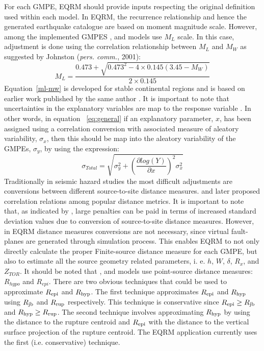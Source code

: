 For each GMPE, EQRM should provide inputs respecting the original
definition used within each model. In EQRM, the recurrence
relationship and hence the generated earthquake catalogue are based
on moment magnitude scale. However, among the implemented GMPES
\citet{eqrm_Gaull90a}, and \citet{eqrm_Liang08} models use $M_L$
scale. In this case, adjustment is done using the correlation
relationship between $M_L$ and $M_W$ as suggested by Johnston
(\textit{pers. comm.}, 2001):
\begin{equation}\label{ml-mw}
M_L =
\frac{0.473+\sqrt{0.473^2-4\times0.145(3.45-M_W)}}{2\times0.145}
\end{equation}
Equation~\ref{ml-mw} is developed for stable continental regions and
is based on earlier work published by the same author
\citep{eqrm_Johnstone96a}. It is important to note that
uncertainties in the explanatory variables are map to the response
variable \citep{eqrm_Bommer05}. In other words, in equation
~\ref{eq:general} if an explanatory parameter, $x$, has been
assigned using a correlation conversion with associated measure of
aleatory variability, $\sigma_x$, then this should be map into the
aleatory variability of the GMPEs, $\sigma_y$, by using the
expression:
\begin{equation}
\sigma_{Total} = \sqrt{\sigma_y^2+(\dfrac{\partial log(Y)}{\partial
x})^2 \sigma_x^2}
\end{equation}
Traditionally in seismic hazard studies the most difficult
adjustments are conversions between different source-to-site
distance measures. \citet{eqrm_Scherbaum04b} and later
\citet{eqrm_Kak11} proposed correlation relations among popular
distance metrics. It is important to note that, as indicated by
\citet{eqrm_Scherbaum05}, large penalties can be paid in terms of
increased standard deviation values due to conversion of
source-to-site distance measures. However, in EQRM distance measures
conversions are not necessary, since virtual fault-planes are
generated through simulation process. This enables EQRM to not only
directly calculate the proper Finite-source distance measure for
each GMPE, but also to estimate all the source geometry related
parameters, i. e. $h$, $W$, $\delta$, $R_x$, and $Z_{TOR}$. It
should be noted that \citet{eqrm_Gaull90a}, and \citet{eqrm_Liang08}
models use point-source distance measures: $R_{hypo}$ and $R_{epi}$.
There are two obvious techniques that could be used to approximate
$\Repi$ and $\Rhyp$. The first technique approximates $\Repi$ and
$\Rhyp$ using $\Rjb$ and $\Rrup$ respectively. This technique is
conservative since \mbox{$\Repi \geq \Rjb$} and \mbox{$\Rhyp \geq
\Rrup$}. The second technique involves approximating $\Rhyp$ by
using the distance to the rupture centroid and $\Repi$ with the
distance to the vertical surface projection of the rupture centroid.
The EQRM application currently uses the first (i.e. conservative)
technique.


